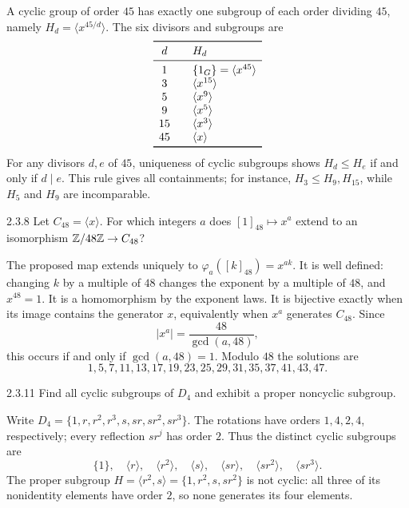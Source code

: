 \documentclass[11pt,oneside]{article}
\begin{document}
\begin{solution}
A cyclic group of order $45$ has exactly one subgroup of each order dividing $45$, namely $H_d=\langle x^{45/d}\rangle$. The six divisors and subgroups are
\[
\begin{array}{c@{\qquad}l}
\toprule
 d & H_d\\
\midrule
 1 & \{1_G\}=\langle x^{45}\rangle\\
 3 & \langle x^{15}\rangle\\
 5 & \langle x^9\rangle\\
 9 & \langle x^5\rangle\\
 15 & \langle x^3\rangle\\
 45 & \langle x\rangle\\
\bottomrule
\end{array}
\]
For any divisors $d,e$ of $45$, uniqueness of cyclic subgroups shows $H_d\le H_e$ if and only if $d\mid e$. This rule gives all containments; for instance, $H_3\le H_9,H_{15}$, while $H_5$ and $H_9$ are incomparable.
\end{solution}

\begin{exercise}{2.3.8}
Let $C_{48}=\langle x\rangle$. For which integers $a$ does $[1]_{48}\mapsto x^a$ extend to an isomorphism $\mathbb{Z}/48\mathbb{Z}\to C_{48}$?
\end{exercise}

\begin{solution}
The proposed map extends uniquely to $\varphi_a([k]_{48})=x^{ak}$. It is well defined: changing $k$ by a multiple of $48$ changes the exponent by a multiple of $48$, and $x^{48}=1$. It is a homomorphism by the exponent laws. It is bijective exactly when its image contains the generator $x$, equivalently when $x^a$ generates $C_{48}$. Since
\[
 |x^a|=\frac{48}{\gcd(a,48)},
\]
this occurs if and only if $\gcd(a,48)=1$. Modulo $48$ the solutions are
\[
\boxed{1,5,7,11,13,17,19,23,25,29,31,35,37,41,43,47}.
\]
\end{solution}

\begin{exercise}{2.3.11}
Find all cyclic subgroups of $D_4$ and exhibit a proper noncyclic subgroup.
\end{exercise}

\begin{solution}
Write $D_4=\{1,r,r^2,r^3,s,sr,sr^2,sr^3\}$. The rotations have orders $1,4,2,4$, respectively; every reflection $sr^j$ has order $2$. Thus the distinct cyclic subgroups are
\[
\{1\},\quad\langle r\rangle,\quad\langle r^2\rangle,\quad\langle s\rangle,\quad\langle sr\rangle,\quad\langle sr^2\rangle,\quad\langle sr^3\rangle.
\]
The proper subgroup $H=\langle r^2,s\rangle=\{1,r^2,s,sr^2\}$ is not cyclic: all three of its nonidentity elements have order $2$, so none generates its four elements.
\end{solution}
\end{document}
